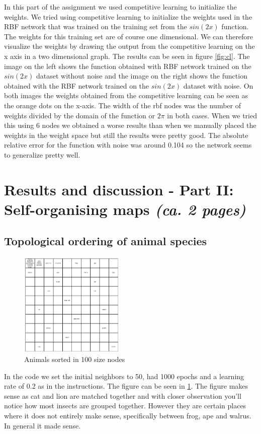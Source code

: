 \documentclass[a4paper]{article}
\begin{document}
In this part of the assignment we used competitive learning to initialize the weights. We tried using competitive learning to initialize the weights used in the RBF network that was trained on the training set from the $sin(2x)$ function. The weights for this training set are of course one dimensional. We can therefore visualize the weights by drawing the output from the competitive learning on the x axis in a two dimensional graph. The results can be seen in figure \ref{fig:cl}. The image on the left shows the function obtained with RBF network trained on the $sin(2x)$ dataset without noise and the image on the right shows the function obtained with the RBF network trained on the $sin(2x)$ dataset with noise. On both images the weights obtained from the competitive learning can be seen as the orange dots on the x-axis. The width of the rbf nodes was the number of weights divided by the domain of the function or $2\pi$ in both cases. When we tried this using 6 nodes we obtained a worse results than when we manually placed the weights in the weight space but still the results were pretty good. The absolute relative error for the function with noise was around 0.104 so the network seems to generalize pretty well. 






\section{Results and discussion - Part II: Self-organising maps \normalsize{\textit{(ca. 2 pages)}}}

\subsection{Topological ordering of animal species}
\begin{figure} [htb]
    \centering
    \includegraphics[width=5cm]{Labs/Lab 2/Results/animal_som.png}
    \caption{Animals sorted in 100 size nodes}
    \label{fig:SOM_animals}
\end{figure}
In the code we set the initial neighbors to 50, had 1000 epochs and a learning rate of 0.2 as in the instructions. The figure can be seen in \ref{fig:SOM_animals}. The figure makes sense as cat and lion are matched together and with closer observation you'll notice how most insects are grouped together. However they are certain places where it does not entirely make sense, specifically between frog, ape and walrus. In general it made sense. 
\end{document}
